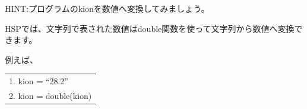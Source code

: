 
\begin{tcolorbox}[title=\useOmetoi,breakable]\label{Q:amedas2}
  \begin{enumerate}
    HINT:プログラムのkionを数値へ変換してみましょう。

    HSPでは、文字列で表された数値はdouble関数を使って文字列から数値へ変換できます。

    例えば、
    \begin{center}
      \begin{tabular}{|l|}
        \hline
        1. kion = “28.2”\\
        2. kion = double(kion)\\
        \hline
      \end{tabular}
    \end{center}
  \end{enumerate}
\end{tcolorbox}



